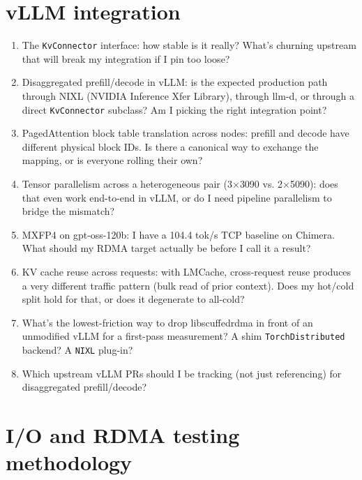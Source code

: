 \documentclass[11pt]{article}
\begin{document}
\section{vLLM integration}

\begin{enumerate}
\item The \texttt{KvConnector} interface: how stable is it really?
What's churning upstream that will break my integration if I pin too
loose?

\item Disaggregated prefill/decode in vLLM: is the expected production
path through NIXL (NVIDIA Inference Xfer Library), through llm-d, or
through a direct \texttt{KvConnector} subclass? Am I picking the right
integration point?

\item PagedAttention block table translation across nodes: prefill and
decode have different physical block IDs. Is there a canonical way to
exchange the mapping, or is everyone rolling their own?

\item Tensor parallelism across a heterogeneous pair (3$\times$3090 vs.
2$\times$5090): does that even work end-to-end in vLLM, or do I need
pipeline parallelism to bridge the mismatch?

\item MXFP4 on gpt-oss-120b: I have a 104.4 tok/s TCP baseline on
Chimera. What should my RDMA target actually be before I call it a
result?

\item KV cache reuse across requests: with LMCache, cross-request
reuse produces a very different traffic pattern (bulk read of prior
context). Does my hot/cold split hold for that, or does it degenerate
to all-cold?

\item What's the lowest-friction way to drop libscuffedrdma in front
of an unmodified vLLM for a first-pass measurement? A shim
\texttt{TorchDistributed} backend? A \texttt{NIXL} plug-in?

\item Which upstream vLLM PRs should I be tracking (not just
referencing) for disaggregated prefill/decode?
\end{enumerate}

\section{I/O and RDMA testing methodology}
\end{document}
